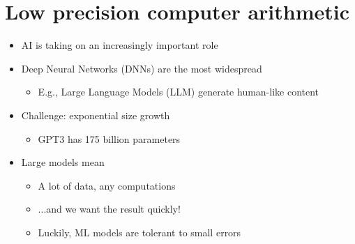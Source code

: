 \documentclass[12pt,openany]{book}
\begin{document}
			      	\section{Low precision computer arithmetic}
			      	
			      	
			      	\begin{itemize}
			      		\item[] AI is taking on an increasingly important role
			      		\item[] Deep Neural Networks (DNNs) are the most widespread
			      		      \begin{itemize}
			      		      	\item[] E.g., Large Language Models (LLM) generate human-like content
			      		      \end{itemize}
			      		\item[] Challenge: exponential size growth
			      		      \begin{itemize}
			      		      	\item[] GPT3 has 175 billion parameters
			      		      \end{itemize}
			      		\item[] Large models mean
			      		      \begin{itemize}
			      		      	\item[] A lot of data, any computations
			      		      	\item[] ...and we want the result quickly!
			      		      	\item[] Luckily, ML models are tolerant to small errors
			      		      \end{itemize}
			      	\end{itemize}
			      	
\end{document}
